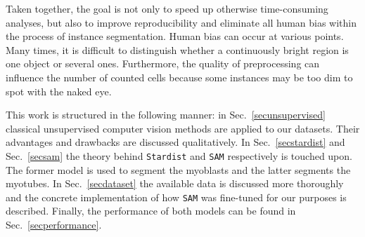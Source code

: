 Taken together, the goal is not only to speed up otherwise time-consuming analyses, but also to improve reproducibility and eliminate all human bias within the process of instance segmentation. Human bias can occur at various points. Many times, it is difficult to distinguish whether a continuously bright region is one object or several ones. Furthermore, the quality of preprocessing can influence the number of counted cells because some instances may be too dim to spot with the naked eye.

This work is structured in the following manner: in Sec.~\ref{secunsupervised} classical unsupervised computer vision methods are applied to our datasets. Their advantages and drawbacks are discussed qualitatively. In Sec.~\ref{secstardist} and Sec.~\ref{secsam} the theory behind \texttt{Stardist} and \texttt{SAM} respectively is touched upon. The former model is used to segment the myoblasts and the latter segments the myotubes. In Sec.~\ref{secdataset} the available data is discussed more thoroughly and the concrete implementation of how \texttt{SAM} was fine-tuned for our purposes is described. Finally, the performance of both models can be found in Sec.~\ref{secperformance}.
